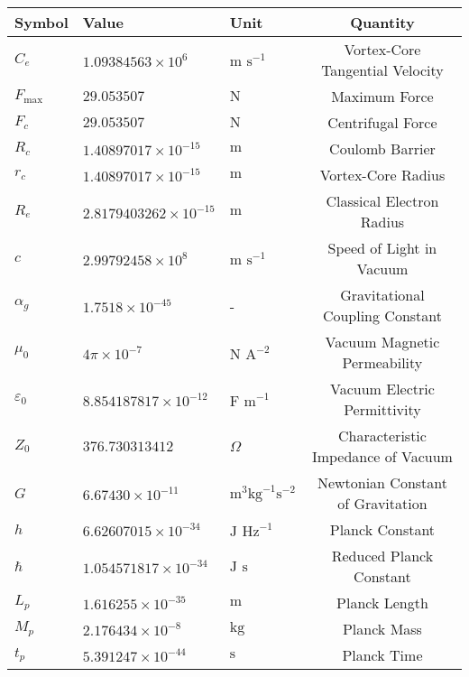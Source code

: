 \documentclass{article}
\begin{document}
    \begin{table}[h]
        \centering
        \renewcommand{\arraystretch}{1.2}
        \begin{tabular}{lllc}
            \toprule
            \textbf{Symbol} & \textbf{Value} & \textbf{Unit} & \textbf{Quantity} \\
            \midrule
            $C_e$ & $1.09384563 \times 10^6$ & $\text{m s}^{-1}$ & Vortex-Core Tangential Velocity \\
            $F_{\text{max}}$ & $29.053507$ & $\text{N}$ & Maximum Force \\
            $F_c$ & $29.053507$ & $\text{N}$ & Centrifugal Force \\
            $R_c$ & $1.40897017 \times 10^{-15}$ & $\text{m}$ & Coulomb Barrier \\
            $r_c$ & $1.40897017 \times 10^{-15}$ & $\text{m}$ & Vortex-Core Radius \\
            $R_e$ & $2.8179403262 \times 10^{-15}$ & $\text{m}$ & Classical Electron Radius \\
            $c$ & $2.99792458 \times 10^8$ & $\text{m s}^{-1}$ & Speed of Light in Vacuum \\
            $\alpha_g$ & $1.7518 \times 10^{-45}$ & - & Gravitational Coupling Constant \\
            $\mu_0$ & $4\pi \times 10^{-7}$ & $\text{N A}^{-2}$ & Vacuum Magnetic Permeability \\
            $\varepsilon_0$ & $8.854187817 \times 10^{-12}$ & $\text{F m}^{-1}$ & Vacuum Electric Permittivity \\
            $Z_0$ & $376.730313412$ & $\Omega$ & Characteristic Impedance of Vacuum \\
            $G$ & $6.67430 \times 10^{-11}$ & $\text{m}^3 \text{kg}^{-1} \text{s}^{-2}$ & Newtonian Constant of Gravitation \\
            $h$ & $6.62607015 \times 10^{-34}$ & $\text{J Hz}^{-1}$ & Planck Constant \\
            $\hbar$ & $1.054571817 \times 10^{-34}$ & $\text{J s}$ & Reduced Planck Constant \\
            $L_p$ & $1.616255 \times 10^{-35}$ & $\text{m}$ & Planck Length \\
            $M_p$ & $2.176434 \times 10^{-8}$ & $\text{kg}$ & Planck Mass \\
            $t_p$ & $5.391247 \times 10^{-44}$ & $\text{s}$ & Planck Time \\

\end{tabular}
\end{table}
\end{document}
